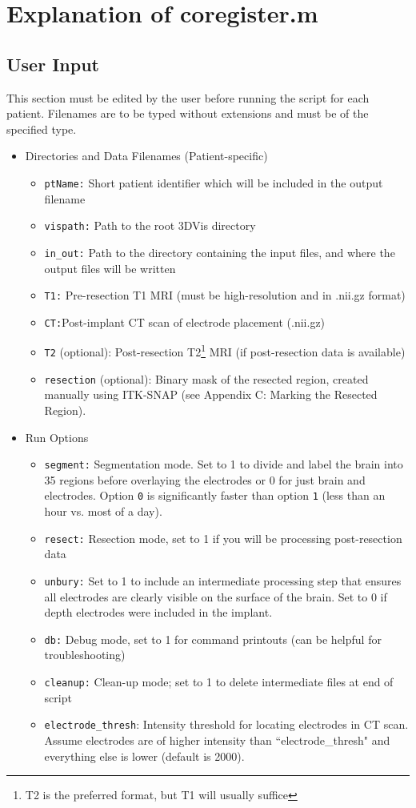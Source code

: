 \documentclass[12pt]{article}
\begin{document}
\section{Explanation of coregister.m}
\subsection{User Input}
This section must be edited by the user before running the script for each patient. Filenames are to be typed without extensions and must be of the specified type. 

\begin{itemize}
\item{Directories and Data Filenames (Patient-specific)}
	\begin{itemize}
	\item \texttt{ptName:} Short patient identifier which will be included in the output filename
	\item \texttt{vispath:} Path to the root 3DVis directory 
	\item \texttt{in\_out:} Path to the directory containing the input files, and where the output files will be written
	\item \texttt{T1:} Pre-resection T1 MRI (must be high-resolution and in .nii.gz format)
	\item \texttt{CT:}Post-implant CT scan of electrode placement (.nii.gz)
	\item \texttt{T2} (optional): Post-resection T2\footnote{T2 is the preferred format, but T1 will usually suffice} MRI (if post-resection data is available)
	\item \texttt{resection} (optional): Binary mask of the resected region, created manually using ITK-SNAP (see Appendix C: Marking the Resected Region). 
	\end{itemize}
\item{Run Options}
	\begin{itemize}
	\item \texttt{segment:} Segmentation mode. Set to 1 to divide and label the brain into 35 regions before overlaying the electrodes or 0 for just brain and electrodes. Option \texttt{0} is significantly faster than option \texttt{1} (less than an hour vs. most of a day).
	\item \texttt{resect:} Resection mode, set to 1 if you will be processing post-resection data
	\item \texttt{unbury:} Set to 1 to include an intermediate processing step that ensures all electrodes are clearly visible on the surface of the brain. Set to 0 if depth electrodes were included in the implant.
	\item \texttt{db:} Debug mode, set to 1 for command printouts (can be helpful for troubleshooting)
	\item \texttt{cleanup:} Clean-up mode; set to 1 to delete intermediate files at end of script
	\item \texttt{electrode\_thresh}: Intensity threshold for locating electrodes in CT scan. Assume electrodes are of higher intensity  than ``electrode\_thresh" and everything else is lower (default is 2000).
\end{itemize}
\end{itemize}
\end{document}
